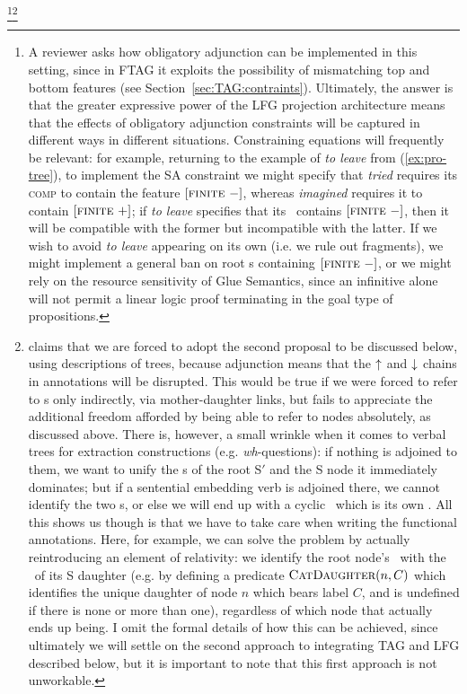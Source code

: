 \documentclass[output=paper,hidelinks]{langscibook}
\begin{document}
\footnote{A reviewer asks how obligatory adjunction can be implemented in this
  setting, since in FTAG it exploits the possibility of mismatching top and
  bottom features (see Section~\ref{sec:TAG:contraints}). Ultimately, the answer is
  that the greater expressive power of the LFG projection architecture means
  that the effects of obligatory adjunction constraints will be captured in
  different ways in different situations. Constraining equations will frequently be relevant:
  for example, returning to the example of \textit{to leave} from
  (\ref{ex:pro-tree}), to implement the SA constraint we might specify that
  \textit{tried} requires its \textsc{comp} to contain the feature
  $[\textsc{finite}~-]$, whereas \textit{imagined} requires it to contain
  $[\textsc{finite}~+]$; if \textit{to leave} specifies that its \fstruc\
  contains $[\textsc{finite}~-]$, then it will be compatible with the former but
  incompatible with the latter. If we wish to avoid \textit{to leave} appearing
  on its own (i.e. we rule out fragments), we might implement a general ban on
  root \fstruc s containing $[\textsc{finite}~-]$, or we might rely on the
  resource sensitivity of Glue Semantics, since an infinitive alone will not
  permit a linear logic proof terminating in the goal type of propositions.}\footnote{\citet[222, fn.~12]{findlay2017} claims that we are forced to adopt
  the second proposal to be discussed below, using descriptions of trees,
  because adjunction means that the $\mbox{$\uparrow$}{}$ and $\mbox{$\downarrow$}{}$ chains in annotations will
  be disrupted. This would be true if we were forced to refer to \fstruc{}s only
  indirectly, via mother-daughter links, but fails to appreciate the additional
  freedom afforded by being able to refer to nodes absolutely, as discussed
  above. There is, however, a small wrinkle when it comes to verbal trees for
  extraction constructions (e.g. \textit{wh}-questions): if nothing is adjoined
  to them, we want to unify the \fstruc{}s of the root S$'$ and the S node it
  immediately dominates; but if a sentential embedding verb is adjoined there,
  we cannot identify the two \fstruc{}s, or else we will end up with a cyclic
  \fstruc\ which is its own \COMP. All this shows us though is that we have to
  take care when writing the functional annotations. Here, for example, we can
  solve the problem by actually reintroducing an element of relativity: we
  identify the root node's \fstruc\ with the \fstruc\ of its S daughter (e.g. by
  defining a predicate $\textsc{CatDaughter}(n,C)$ which identifies the unique
  daughter of node $n$ which bears label $C$, and is undefined if there is none
  or more than one), regardless of which node that actually ends up being. I
  omit the formal details of how this can be achieved, since ultimately we will
  settle on the second approach to integrating TAG and LFG described below, but
  it is important to note that this first approach is not unworkable.}
\end{document}
